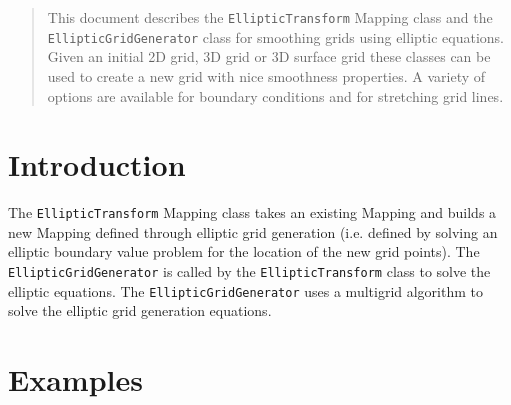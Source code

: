 \documentclass{article}
\begin{document}


\newcommand{\primer}{/home/henshaw/res/primer}
\newcommand{\gf}{/home/henshaw/res/gf}
\newcommand{\mapping}{/home/henshaw/res/mapping}
\newcommand{\ogshow}{/home/henshaw/res/ogshow}
\newcommand{\oges}{/home/henshaw/res/oges}
\newcommand{\figures}{../docFigures}

\baselineskip
{}

\baselineskip

\begin{abstract}
This document describes the {\tt EllipticTransform} Mapping class and the {\tt EllipticGridGenerator}
class for smoothing grids using elliptic equations.
Given an initial 2D grid, 3D grid or 3D surface grid these classes can be used to create a new
grid with nice smoothness properties. A variety of options are available for boundary conditions
and for stretching grid lines.
\end{abstract}


\vfill\eject
\tableofcontents

\section{Introduction}

The {\tt EllipticTransform} Mapping class takes an existing Mapping and builds a new Mapping
defined through elliptic grid generation (i.e. defined by solving an elliptic boundary value problem
for the location of the new grid points). The {\tt EllipticGridGenerator} is called by the
{\tt EllipticTransform} class to solve the elliptic equations. The {\tt EllipticGridGenerator} 
uses a multigrid algorithm to solve the elliptic grid generation equations.


\vfill\eject


\section{Examples}




\vfill\eject


\end{document}
